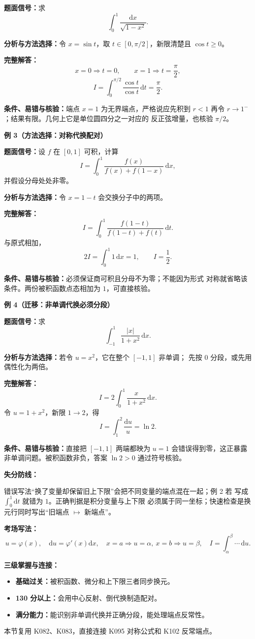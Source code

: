 \begin{knowledgeBox}
\textbf{题面信号：}求
\[
\int_0^1\frac{\mathrm dx}{\sqrt{1-x^2}}.
\]

\textbf{分析与方法选择：}令 \(x=\sin t\)，取
\(t\in[0,\pi/2]\)，新限清楚且 \(\cos t\ge0\)。

\textbf{完整解答：}
\[
x=0\Rightarrow t=0,\qquad x=1\Rightarrow t=\frac\pi2,
\]
\[
I=\int_0^{\pi/2}\frac{\cos t}{\cos t}\,\mathrm dt
=\frac\pi2.
\]

\textbf{条件、易错与核验：}端点 \(x=1\) 为无界端点，严格说应先积到
\(r<1\) 再令 \(r\to1^-\)；结果有限。几何上它是单位圆四分之一对应的
反正弦增量，也核验 \(\pi/2\)。

\textbf{例 3（方法选择：对称代换配对）}

\textbf{题面信号：}设 \(f\) 在 \([0,1]\) 可积，计算
\[
I=\int_0^1\frac{f(x)}{f(x)+f(1-x)}\,\mathrm dx,
\]
并假设分母处处非零。

\textbf{分析与方法选择：}令 \(x=1-t\) 会交换分子中的两项。

\textbf{完整解答：}
\[
I=\int_0^1\frac{f(1-t)}{f(1-t)+f(t)}\,\mathrm dt.
\]
与原式相加，
\[
2I=\int_0^1 1\,\mathrm dx=1,
\qquad \boxed{I=\frac12}.
\]

\textbf{条件、易错与核验：}必须保证商可积且分母不为零；不能因为形式
对称就省略该条件。两份被积函数点态相加为 \(1\)，可直接核验。

\textbf{例 4（迁移：非单调代换必须分段）}

\textbf{题面信号：}求
\[
\int_{-1}^{1}\frac{|x|}{1+x^2}\,\mathrm dx.
\]

\textbf{分析与方法选择：}若令 \(u=x^2\)，它在整个 \([-1,1]\) 非单调；
先按 \(0\) 分段，或先用偶性化为两倍。

\textbf{完整解答：}
\[
I=2\int_0^1\frac{x}{1+x^2}\,\mathrm dx.
\]
令 \(u=1+x^2\)，新限 \(1\to2\)，得
\[
I=\int_1^2\frac{\mathrm du}{u}=\ln2.
\]

\textbf{条件、易错与核验：}直接把 \([-1,1]\) 两端都映为 \(u=1\)
会错误得到零，这正暴露非单调问题。被积函数非负，答案 \(\ln2>0\)
通过符号核验。

\textbf{失分防线：}

错误写法“换了变量却保留旧上下限”会把不同变量的端点混在一起；例 2 若
写成 \(\int_0^1\mathrm dt\) 就错为 \(1\)。正确判据是积分变量与上下限
必须属于同一坐标；快速检查是换元行同时写出“旧端点 \(\mapsto\) 新端点”。

\textbf{考场写法：}
\[
u=\varphi(x),\quad \mathrm du=\varphi'(x)\mathrm dx,\quad
x=a\Rightarrow u=\alpha,\ x=b\Rightarrow u=\beta,
\quad I=\int_\alpha^\beta\cdots\,\mathrm du.
\]

\textbf{三级掌握与连接：}
\begin{itemize}
  \item \textbf{基础过关：}被积函数、微分和上下限三者同步换元。
  \item \textbf{130 分以上：}会用中心反射、倒代换制造配对。
  \item \textbf{满分能力：}能识别非单调代换并正确分段，能处理端点反常性。
\end{itemize}
本节复用 K082、K083，直接连接 K095 对称公式和 K102 反常端点。
\end{knowledgeBox}

